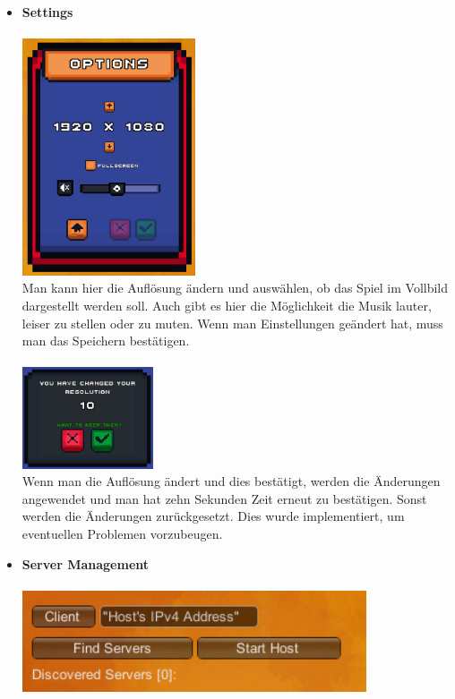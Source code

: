 \begin{itemize}
\begin {itemize}
            Es gibt die Möglichkeit die Credits vorzeitig zu verlassen. Dies geschieht durch das Drücken des Knopfes mit den Hausbutton. Die Tester fanden dies auch sehr intuitiv.
        \item \textbf{Settings}\\
            \\
            \includegraphics*[height=7cm]{resources/setting.png}\\
            Man kann hier die Auflösung ändern und auswählen, ob das Spiel im Vollbild dargestellt werden soll. Auch gibt es hier die Möglichkeit die Musik lauter, leiser zu stellen
            oder zu muten. Wenn man Einstellungen geändert hat, muss man das Speichern bestätigen. \\
            \\
            \includegraphics*[height=3cm]{resources/resolution.png}\\
            Wenn man die Auflösung ändert und dies bestätigt, werden die Änderungen angewendet und man hat zehn Sekunden Zeit erneut zu bestätigen. Sonst werden die Änderungen zurückgesetzt.
            Dies wurde implementiert, um eventuellen Problemen vorzubeugen. 
        \item \textbf{Server Management}\\
            \\
            \includegraphics*[height = 3cm]{resources/server.png}\\

\end{itemize}
\end{itemize}
